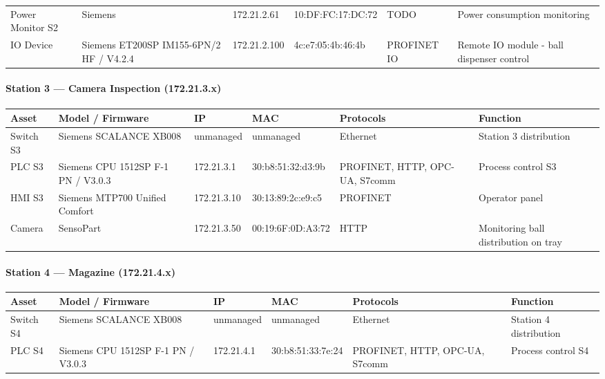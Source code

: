 \documentclass[11pt,a4paper]{article}
\begin{document}
{\begin{longtable}{L{2cm} L{2.1cm} L{2.1cm} L{2.6cm} L{2.4cm} L{4cm}}
    Power Monitor S2 & Siemens & 172.21.2.61 & 10:DF:FC:17:DC:72 & TODO & Power
    consumption monitoring \\

    IO Device & Siemens ET200SP IM155-6PN/2 HF / V4.2.4 & 172.21.2.100 &
    4c:e7:05:4b:46:4b & PROFINET IO & Remote IO module - ball dispenser control \\
\bottomrule
\end{longtable}

\paragraph{Station 3 --- Camera Inspection (172.21.3.x)}
\begin{longtable}{L{2cm} L{2.1cm} L{2.1cm} L{2.6cm} L{2.4cm} L{4cm}}
\toprule
\textbf{Asset} & \textbf{Model / Firmware} & \textbf{IP} & \textbf{MAC} & \textbf{Protocols} & \textbf{Function} \\
\midrule \endhead
    Switch S3 & Siemens SCALANCE XB008 & unmanaged & unmanaged & Ethernet &
    Station 3 distribution \\

    PLC S3 & Siemens CPU 1512SP F-1 PN / V3.0.3 & 172.21.3.1 & 30:b8:51:32:d3:9b &
    PROFINET, HTTP, OPC-UA, S7comm & Process control S3 \\

    HMI S3 & Siemens MTP700 Unified Comfort & 172.21.3.10 & 30:13:89:2c:e9:c5 &
    PROFINET & Operator panel \\

    Camera & SensoPart & 172.21.3.50 & 00:19:6F:0D:A3:72 & HTTP & Monitoring ball distribution on tray \\

\bottomrule
\end{longtable}

\paragraph{Station 4 --- Magazine (172.21.4.x)}
\begin{longtable}{L{2cm} L{2.1cm} L{2.1cm} L{2.6cm} L{2.4cm} L{4cm}}
\toprule
\textbf{Asset} & \textbf{Model / Firmware} & \textbf{IP} & \textbf{MAC} & \textbf{Protocols} & \textbf{Function} \\
\midrule \endhead
    Switch S4 & Siemens SCALANCE XB008 & unmanaged & unmanaged & Ethernet &
    Station 4 distribution \\

    PLC S4 & Siemens CPU 1512SP F-1 PN / V3.0.3 & 172.21.4.1 & 30:b8:51:33:7e:24 &
    PROFINET, HTTP, OPC-UA, S7comm & Process control S4 \\


\end{longtable}}
\end{document}
